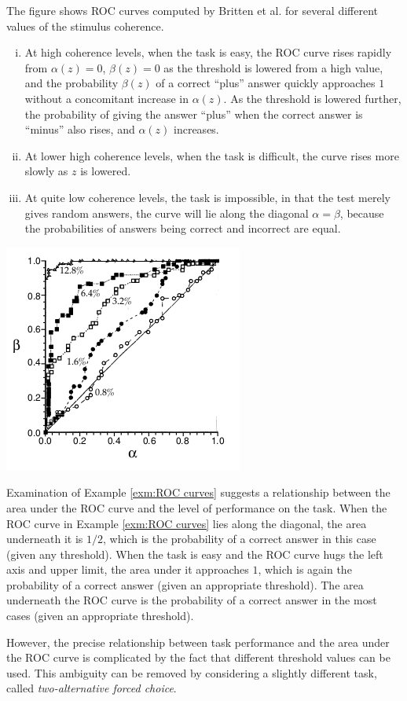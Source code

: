 \begin{exm}
  \label{exm:ROC curves}
The figure shows ROC curves computed by Britten et al. for several different values of the stimulus coherence.
\begin{enumerate}[(i)]
\item At high coherence levels, when
the task is easy, the ROC curve rises rapidly from $\alpha(z)=0$,
$\beta(z)=0$ as the threshold is lowered from a high value, and the
probability $\beta(z)$ of a correct “plus” answer quickly approaches
$1$ without a concomitant increase in $\alpha(z)$. As the threshold is
lowered further, the probability of giving the answer “plus” when
the correct answer is “minus” also rises, and $\alpha(z)$ increases.
\item At lower high coherence levels, when the task is difficult, the
  curve rises more slowly as $z$ is lowered.
\item At quite low coherence levels, the task is impossible, in that
  the test merely gives random answers, the curve will lie along the diagonal $\alpha=\beta$, because the probabilities of answers being correct and incorrect are equal.
\end{enumerate}
\begin{center}
    \includegraphics[scale = 0.5]{png/3-3}
 \end{center}
\end{exm}

\begin{rem}
  Examination of Example \ref{exm:ROC curves} suggests a relationship between
  the area under the ROC curve and the level of performance on the
  task. When the ROC curve in Example \ref{exm:ROC curves} lies along the diagonal, the
  area underneath it is $1/2$, which is the probability of a correct
  answer in this case (given any threshold). When the task is easy and
  the ROC curve hugs the left axis and upper limit, the area under it approaches $1$, which is again the
  probability of a correct answer (given an appropriate threshold). The
  area underneath the ROC curve is the probability of a correct answer
  in the most cases (given an appropriate threshold).

  However, the precise relationship between task performance and the area under
the ROC curve is complicated by the fact that different threshold values can be
used. This ambiguity can be removed by considering a slightly different
task, called \emph{two-alternative forced choice}.
\end{rem}

